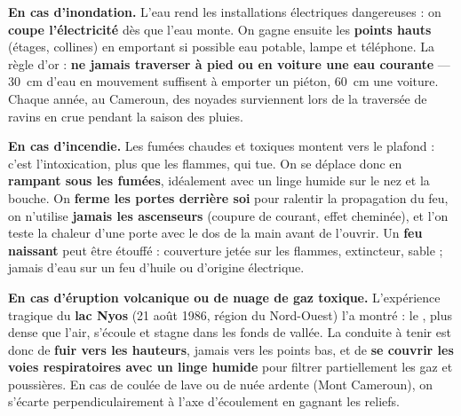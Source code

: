 \documentclass[11pt]{article}
\begin{document}
\textbf{En cas d'inondation.} L'eau rend les installations électriques dangereuses : on \textbf{coupe l'électricité} dès que l'eau monte. On gagne ensuite les \textbf{points hauts} (étages, collines) en emportant si possible eau potable, lampe et téléphone. La règle d'or : \textbf{ne jamais traverser à pied ou en voiture une eau courante} — \SI{30}{cm} d'eau en mouvement suffisent à emporter un piéton, \SI{60}{cm} une voiture. Chaque année, au Cameroun, des noyades surviennent lors de la traversée de ravins en crue pendant la saison des pluies.

\textbf{En cas d'incendie.} Les fumées chaudes et toxiques montent vers le plafond : c'est l'intoxication, plus que les flammes, qui tue. On se déplace donc en \textbf{rampant sous les fumées}, idéalement avec un linge humide sur le nez et la bouche. On \textbf{ferme les portes derrière soi} pour ralentir la propagation du feu, on n'utilise \textbf{jamais les ascenseurs} (coupure de courant, effet cheminée), et l'on teste la chaleur d'une porte avec le dos de la main avant de l'ouvrir. Un \textbf{feu naissant} peut être étouffé : couverture jetée sur les flammes, extincteur, sable ; jamais d'eau sur un feu d'huile ou d'origine électrique.

\textbf{En cas d'éruption volcanique ou de nuage de gaz toxique.} L'expérience tragique du \textbf{lac Nyos} (21 août 1986, région du Nord-Ouest) l'a montré : le , plus dense que l'air, s'écoule et stagne dans les fonds de vallée. La conduite à tenir est donc de \textbf{fuir vers les hauteurs}, jamais vers les points bas, et de \textbf{se couvrir les voies respiratoires avec un linge humide} pour filtrer partiellement les gaz et poussières. En cas de coulée de lave ou de nuée ardente (Mont Cameroun), on s'écarte perpendiculairement à l'axe d'écoulement en gagnant les reliefs.
\end{document}
